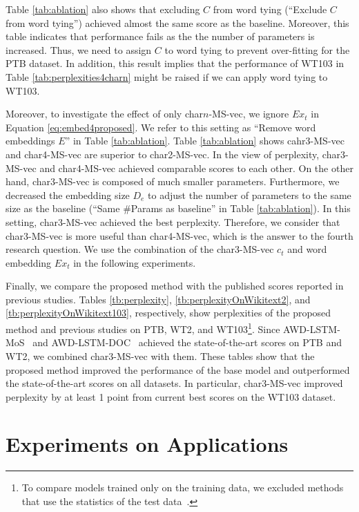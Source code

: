 \documentclass[letterpaper]{article} %
\begin{document}
Table \ref{tab:ablation} also shows that excluding $C$ from word tying (``Exclude $C$ from word tying'') achieved almost the same score as the baseline.
Moreover, this table indicates that performance fails as the the number of parameters is increased.
Thus, we need to assign $C$ to word tying to prevent over-fitting for the PTB dataset.
In addition, this result implies that the performance of WT103 in Table \ref{tab:perplexities4charn} might be raised if we can apply word tying to WT103.


Moreover, to investigate the effect of only char$n$-MS-vec, we ignore $E x_t$ in Equation \ref{eq:embed4proposed}.
We refer to this setting as ``Remove word embeddings $E$'' in Table \ref{tab:ablation}.
Table \ref{tab:ablation} shows cahr3-MS-vec and char4-MS-vec are superior to char2-MS-vec.
In the view of perplexity, char3-MS-vec and char4-MS-vec achieved comparable scores to each other.
On the other hand, char3-MS-vec is composed of much smaller parameters.
Furthermore, we decreased the embedding size $D_e$ to adjust the number of parameters to the same size as the baseline (``Same \#Params as baseline'' in Table \ref{tab:ablation}).
In this setting, char3-MS-vec achieved the best perplexity.
Therefore, we consider that char3-MS-vec is more useful than char4-MS-vec, which is the answer to the fourth research question.
We use the combination of the char3-MS-vec $c_t$ and word embedding $E x_t$ in the following experiments.


Finally, we compare the proposed method with the published scores reported in previous studies.
Tables \ref{tb:perplexity}, \ref{tb:perplexityOnWikitext2}, and \ref{tb:perplexityOnWikitext103}, respectively, show perplexities of the proposed method and previous studies on PTB, WT2, and WT103\footnote{To compare models trained only on the training data, we excluded methods that use the statistics of the test data~\cite{DBLP:journals/corr/GraveJU16,DBLP:journals/corr/abs-1709-07432}.}.
Since AWD-LSTM-MoS~\cite{DBLP:journals/corr/abs-1711-03953} and AWD-LSTM-DOC~\cite{D18-1489} achieved the state-of-the-art scores on PTB and WT2, we combined char3-MS-vec with them.
These tables show that the proposed method improved the performance of the base model and outperformed the state-of-the-art scores on all datasets.
In particular, char3-MS-vec improved perplexity by at least 1 point from current best scores on the WT103 dataset.



\section{Experiments on Applications}
\end{document}
